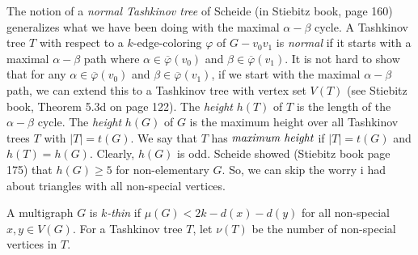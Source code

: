 \documentclass[12pt]{amsart}
\theoremstyle{plain}
\theoremstyle{definition}
\theoremstyle{remark}
\newcommand{\vph}{\varphi}
\newcommand{\vphn}{\overline{\varphi}}
\begin{document}
The notion of a \emph{normal Tashkinov tree} of Scheide (in Stiebitz book, page 160) generalizes what we have been doing with the maximal $\alpha-\beta$ cycle.  
A Tashkinov tree $T$ with respect to a $k$-edge-coloring $\vph$ of $G - v_0v_1$ is \emph{normal} if it starts with a maximal $\alpha-\beta$ path where $\alpha \in \vphn(v_0)$ and $\beta \in \vphn(v_1)$.  It is not hard
to show that for any $\alpha \in \vphn(v_0)$ and $\beta \in \vphn(v_1)$, if we start with the maximal $\alpha-\beta$ path, we can extend this to a Tashkinov tree with vertex set $V(T)$ (see Stiebitz book, Theorem 5.3d on page 122).
The \emph{height} $h(T)$ of $T$ is the length of the $\alpha-\beta$ cycle.  The \emph{height} $h(G)$ of $G$ is the maximum height over all Tashkinov trees $T$ with $|T| = t(G)$.  
We say that $T$ has $\emph{maximum height}$ if $|T| = t(G)$ and $h(T) = h(G)$.  Clearly, $h(G)$ is odd.  Scheide showed (Stiebitz book page 175) that $h(G) \ge 5$ for non-elementary $G$.  
So, we can skip the worry i had about triangles with all non-special vertices.

A multigraph $G$ is \emph{$k$-thin} if $\mu(G) < 2k - d(x) - d(y)$ for all non-special $x,y \in V(G)$.  For a Tashkinov tree $T$, let $\nu(T)$ be the number of non-special vertices in $T$.
\end{document}
